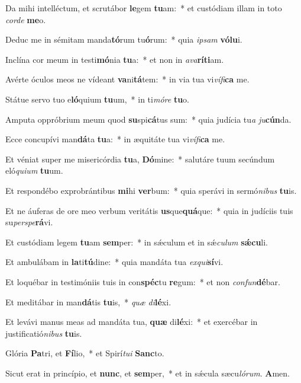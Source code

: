 ﻿\item Da mihi intelléctum, et scrutábor \textbf{le}gem \textbf{tu}am:~* et custódiam illam in toto \emph{cor}\emph{de} \textbf{me}o.
\item Deduc me in sémitam manda\textbf{tó}rum tu\textbf{ó}rum:~* quia \emph{ip}\emph{sam} \textbf{vó}\textbf{lu}i.
\item Inclína cor meum in testi\textbf{mó}nia \textbf{tu}a:~* et non in \emph{a}\emph{va}\textbf{rí}\textbf{ti}am.
\item Avérte óculos meos ne vídeant \textbf{va}ni\textbf{tá}tem:~* in via tua vi\emph{ví}\emph{fi}\textbf{ca} me.
\item Státue servo tuo e\textbf{ló}quium \textbf{tu}um,~* in ti\emph{mó}\emph{re} \textbf{tu}o.
\item Amputa oppróbrium meum quod \textbf{su}spi\textbf{cá}tus sum:~* quia judícia tu\emph{a} \emph{ju}\textbf{cún}da.
\item Ecce concupívi man\textbf{dá}ta \textbf{tu}a:~* in æquitáte tua vi\emph{ví}\emph{fi}\textbf{ca} me.
\item Et véniat super me misericórdia \textbf{tu}a, \textbf{Dó}mine:~* salutáre tuum secúndum eló\emph{qui}\emph{um} \textbf{tu}um.
\item Et respondébo exprobrántibus \textbf{mi}hi \textbf{ver}bum:~* quia sperávi in sermó\emph{ni}\emph{bus} \textbf{tu}is.
\item Et ne áuferas de ore meo verbum veritátis \textbf{us}que\textbf{quá}que:~* quia in judíciis tuis su\emph{per}\emph{spe}\textbf{rá}vi.
\item Et custódiam legem \textbf{tu}am \textbf{sem}per:~* in sǽculum et in sǽ\emph{cu}\emph{lum} \textbf{sǽ}\textbf{cu}li.
\item Et ambulábam in \textbf{la}ti\textbf{tú}dine:~* quia mandáta tua \emph{ex}\emph{qui}\textbf{sí}vi.
\item Et loquébar in testimóniis tuis in con\textbf{spéc}tu \textbf{re}gum:~* et non \emph{con}\emph{fun}\textbf{dé}bar.
\item Et meditábar in man\textbf{dá}tis \textbf{tu}is,~* \emph{quæ} \emph{di}\textbf{lé}xi.
\item Et levávi manus meas ad mandáta tua, \textbf{quæ} di\textbf{lé}xi:~* et exercébar in justificatió\emph{ni}\emph{bus} \textbf{tu}is.
\item Glória \textbf{Pa}tri, et \textbf{Fí}lio,~* et Spirí\emph{tu}\emph{i} \textbf{Sanc}to.
\item Sicut erat in princípio, et \textbf{nunc}, et \textbf{sem}per,~* et in sǽcula sæcu\emph{ló}\emph{rum}. \textbf{A}men.